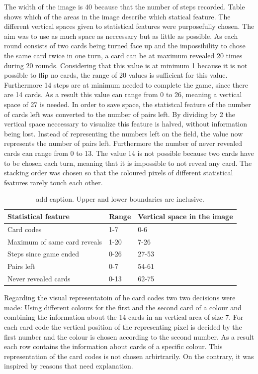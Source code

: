 The width of the image is 40 because that the number of steps recorded. Table  shows which of the areas in the image describe which statical feature. The different vertical spaces given to statistical features were purposefully chosen. The aim was to use as much space as neccessary but as little as possible. As each round consists of two cards being turned face up and the impossibility to chose the same card twice in one turn, a card can be at maximum revealed 20 times during 20 rounds. Considering that this value is at minimum 1 because it is not possible to flip no cards, the range of 20 values is sufficient for this value. Furthermore 14 steps are at minimum needed to complete the game, since there are 14 cards. As a result this value can range from 0 to 26, meaning a vertical space of 27 is needed. In order to save space, the statistcal feature of the number of cards left was converted to the number of pairs left. By dividing by 2 the vertical space neccessary to visualize this feature is halved, without information being lost. Instead of representing the numbers left on the field, the value now represents the number of pairs left. Furthermore the number of never revealed cards can range from 0 to 13. The value 14 is not possible because two cards have to be chosen each turn, meaning that it is impossible to not reveal any card. The stacking order was chosen so that the coloured pixels of different statistical features rarely touch each other. 
\begin{table}[H]
	\centering
	\caption{add caption. Upper and lower boundaries are inclusive.}%
	\begin{tabular}{|l|l|l|}
		\hline
		Statistical feature & Range & Vertical space in the image \\
		\hline
		Card codes & 1-7 & 0-6 \\
		Maximum of same card reveals & 1-20 & 7-26 \\
		Steps since game ended & 0-26 & 27-53 \\
		Pairs left & 0-7 & 54-61\\
		Never revealed cards & 0-13 & 62-75 \\
		\hline
	\end{tabular}
\end{table}

Regarding the visual representatoin of he card codes two two decisions were made: Using different colours for the first and the second card of a colour and combining the information about the 14 cards in an vertical area of size 7. For each card code the vertical position of the representing pixel is decided by the first number and the colour is chosen according to the second number. As a result each row contains the information about cards of a specific colour. This representation of the card codes is not chosen arbirtrarily. On the contrary, it was inspired by reasons that need explanation.

